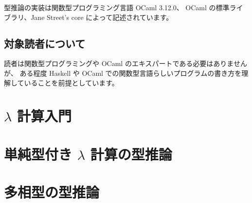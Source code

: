 \documentclass[b5paper]{jsbook}
\theoremstyle{break}
\begin{document}
型推論の実装は関数型プログラミング言語 OCaml 3.12.0、
OCaml の標準ライブラリ、Jane Street's core によって記述されています。

\section*{対象読者について}

読者は関数型プログラミングや OCaml のエキスパートである必要はありませんが、
ある程度 Haskell や OCaml での関数型言語らしいプログラムの書き方を理解していることを前提としています。

\tableofcontents

\newpage


\chapter{$\lambda$ 計算入門}



\chapter{単純型付き $\lambda$ 計算の型推論}



\chapter{多相型の型推論}


\end{document}
